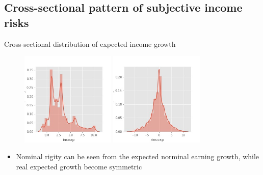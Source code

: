 \documentclass{beamer}
\begin{document}
\subsection{Cross-sectional pattern of subjective income risks}

\begin{frame}{Cross-sectional distribution of expected income growth}
	\begin{figure}
		\centering
		\label{incexp_hist}
		\includegraphics[width=0.4\textwidth]{figures/hist_incexp}
		\includegraphics[width=0.4\textwidth]{figures/hist_rincexp} 
	\end{figure}
	\begin{itemize}
		\item Nominal rigity can be seen from the expected norminal earning growth, while real expected growth become symmetric 
	\end{itemize}
\end{frame}
\end{document}
